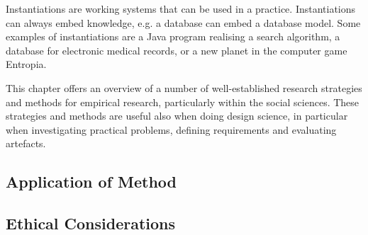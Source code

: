 Instantiations are working systems that can be used in a practice.
Instantiations can always embed knowledge, e.g. a database can embed
a database model. Some examples of instantiations are a Java
program realising a search algorithm, a database for electronic medical
records, or a new planet in the computer game Entropia.


This chapter offers an overview
of a number of well-established research strategies and methods for
empirical research, particularly within the social sciences. These
strategies and methods are useful also when doing design science, in
particular when investigating practical problems, defining requirements
and evaluating artefacts.








\subsection{Application of Method}

\subsection{Ethical Considerations}
